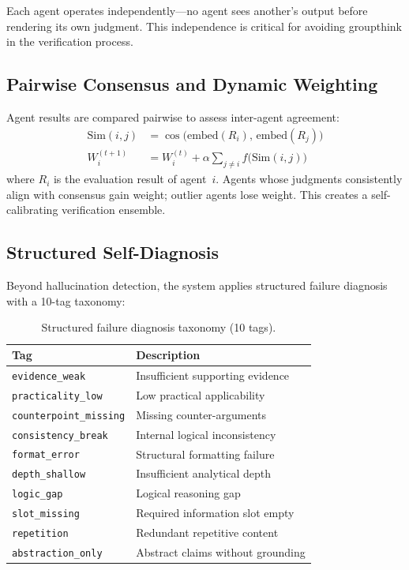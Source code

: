 \documentclass[11pt,a4paper]{article}
\begin{document}
Each agent operates independently---no agent sees another's output before rendering its own
judgment. This independence is critical for avoiding groupthink in the verification process.

\subsection{Pairwise Consensus and Dynamic Weighting}

Agent results are compared pairwise to assess inter-agent agreement:
\begin{align}
  \text{Sim}(i,j) &= \cos\!\bigl(\text{embed}(R_i),\, \text{embed}(R_j)\bigr) \\
  W_i^{(t+1)} &= W_i^{(t)} + \alpha \sum_{j \neq i} f\!\bigl(\text{Sim}(i,j)\bigr)
\end{align}
where $R_i$ is the evaluation result of agent~$i$. Agents whose judgments consistently
align with consensus gain weight; outlier agents lose weight. This creates a self-calibrating
verification ensemble.

\subsection{Structured Self-Diagnosis}

Beyond hallucination detection, the system applies structured failure diagnosis with a
10-tag taxonomy:

\begin{table}[h]
\centering
\caption{Structured failure diagnosis taxonomy (10 tags).}
\label{tab:failtags}
\small
\begin{tabular}{@{}ll@{}}
\toprule
\textbf{Tag} & \textbf{Description} \\
\midrule
\texttt{evidence\_weak}       & Insufficient supporting evidence \\
\texttt{practicality\_low}    & Low practical applicability \\
\texttt{counterpoint\_missing}& Missing counter-arguments \\
\texttt{consistency\_break}   & Internal logical inconsistency \\
\texttt{format\_error}        & Structural formatting failure \\
\texttt{depth\_shallow}       & Insufficient analytical depth \\
\texttt{logic\_gap}           & Logical reasoning gap \\
\texttt{slot\_missing}        & Required information slot empty \\
\texttt{repetition}           & Redundant repetitive content \\
\texttt{abstraction\_only}    & Abstract claims without grounding \\
\bottomrule
\end{tabular}
\end{table}
\end{document}
